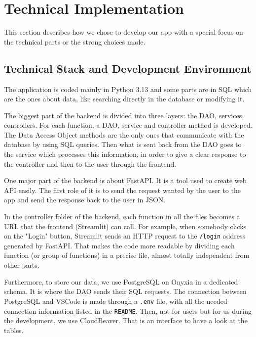 \section{Technical Implementation}

\bigskip
\bigskip

This section describes how we chose to develop our app with a special focus on the technical parts or the strong choices made. 

\bigskip
\bigskip

\subsection{Technical Stack and Development Environment}

\bigskip
\bigskip

The application is coded mainly in Python 3.13 and some parts are in SQL which are the ones about data, like searching directly in the database or modifying it.

\bigskip

The biggest part of the backend is divided into three layers: the DAO, services, controllers. For each function, a DAO, service and controller method is developed. The Data Access Object methods are the only ones that communicate with the database by using SQL queries. Then what is sent back from the DAO goes to the service which processes this information, in order to give a clear response to the controller and then to the user through the frontend.

\medskip

One major part of the backend is about FastAPI. It is a tool used to create web API easily. The first role of it is to send the request wanted by the user to the app and send the response back to the user in JSON.

\bigskip

In the controller folder of the backend, each function in all the files becomes a URL that the frontend (Streamlit) can call. For example, when somebody clicks on the "Login" button, Streamlit sends an HTTP request to the \texttt{/login} address generated by FastAPI. That makes the code more readable by dividing each function (or group of functions) in a precise file, almost totally independent from other parts. 

\bigskip

Furthermore, to store our data, we use PostgreSQL on Onyxia in a dedicated schema. It is where the DAO sends their SQL requests. The connection between PostgreSQL and VSCode is made through  a \texttt{.env} file, with all the needed connection information listed in the \texttt{README}. Then, not for users but for us during the development, we use CloudBeaver. That is an interface to have a look at the tables. 

